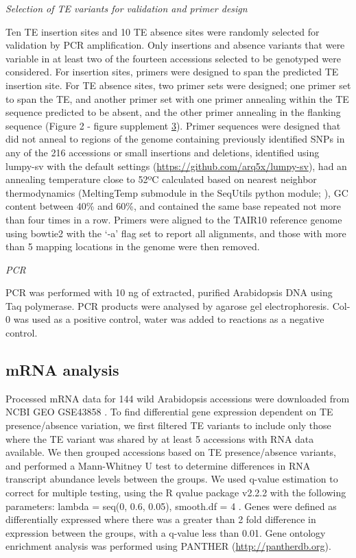\documentclass[12pt]{article}
\begin{document}
\emph{Selection of TE variants for validation and primer design}

Ten TE insertion sites and 10 TE absence sites were randomly selected
for validation by PCR amplification. Only insertions and absence
variants that were variable in at least two of the fourteen accessions
selected to be genotyped were considered. For insertion sites, primers
were designed to span the predicted TE insertion site. For TE absence
sites, two primer sets were designed; one primer set to span the TE,
and another primer set with one primer annealing within the TE
sequence predicted to be absent, and the other primer annealing in the
flanking sequence (Figure 2 - figure supplement \hyperref[fig2s3]{3}). Primer
sequences were designed that did not anneal to regions of the genome
containing previously identified SNPs in any of the 216 accessions
\cite{Schmitz:2013iu} or small insertions and deletions, identified
using lumpy-sv with the default settings
\cite{Layer:2014ie}(\url{https://github.com/arq5x/lumpy-sv}), had an
annealing temperature close to 52ºC calculated based on nearest
neighbor thermodynamics (MeltingTemp submodule in the SeqUtils python
module; \cite{Cock:2009hj}), GC content between 40\% and 60\%, and
contained the same base repeated not more than four times in a
row. Primers were aligned to the TAIR10 reference genome using bowtie2
\cite{Langmead:2012jh} with the `-a' flag set to report all
alignments, and those with more than 5 mapping locations in the genome
were then removed.

\emph{PCR}

PCR was performed with 10 ng of extracted, purified Arabidopsis DNA
using Taq polymerase. PCR products were analysed by agarose gel
electrophoresis. Col-0 was used as a positive control, water was added
to reactions as a negative control.

\subsection{mRNA analysis}

Processed mRNA data for 144 wild Arabidopsis accessions were downloaded
from NCBI GEO GSE43858 \cite{Schmitz:2013iu}. To find differential gene
expression dependent on TE presence/absence variation, we first filtered
TE variants to include only those where the TE variant was shared by at
least 5 accessions with RNA data available. We then grouped accessions
based on TE presence/absence variants, and performed a Mann-Whitney U
test to determine differences in RNA transcript abundance levels between
the groups. We used q-value estimation to correct for multiple testing,
using the R qvalue package v2.2.2 with the following parameters: lambda
= seq(0, 0.6, 0.05), smooth.df = 4 \cite{Storey:2003cj}. Genes were
defined as differentially expressed where there was a greater than 2
fold difference in expression between the groups, with a q-value less
than 0.01. Gene ontology enrichment analysis was performed using PANTHER
(\url{http://pantherdb.org}).
\end{document}
